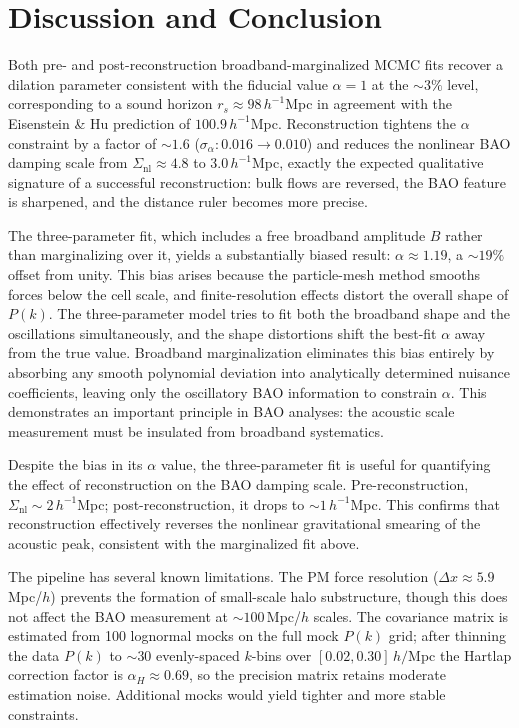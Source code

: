 \documentclass[10pt]{article}
\begin{document}
\section{Discussion and Conclusion}
\label{sec:discussion}

Both pre- and post-reconstruction broadband-marginalized MCMC fits recover a dilation parameter consistent with the fiducial value $\alpha = 1$ at the $\sim\!3\%$ level, corresponding to a sound horizon $r_s \approx 98\,h^{-1}$Mpc in agreement with the Eisenstein \& Hu prediction of $100.9\,h^{-1}$Mpc.  Reconstruction tightens the $\alpha$ constraint by a factor of $\sim\!1.6$ ($\sigma_\alpha: 0.016 \to 0.010$) and reduces the nonlinear BAO damping scale from $\Sigma_{\mathrm{nl}} \approx 4.8$ to $3.0\,h^{-1}$Mpc, exactly the expected qualitative signature of a successful reconstruction: bulk flows are reversed, the BAO feature is sharpened, and the distance ruler becomes more precise.

The three-parameter fit, which includes a free broadband amplitude $B$ rather than marginalizing over it, yields a substantially biased result: $\alpha \approx 1.19$, a $\sim\!19\%$ offset from unity.  This bias arises because the particle-mesh method smooths forces below the cell scale, and finite-resolution effects distort the overall shape of $P(k)$.  The three-parameter model tries to fit both the broadband shape and the oscillations simultaneously, and the shape distortions shift the best-fit $\alpha$ away from the true value.  Broadband marginalization eliminates this bias entirely by absorbing any smooth polynomial deviation into analytically determined nuisance coefficients, leaving only the oscillatory BAO information to constrain $\alpha$.  This demonstrates an important principle in BAO analyses: the acoustic scale measurement must be insulated from broadband systematics.

Despite the bias in its $\alpha$ value, the three-parameter fit is useful for quantifying the effect of reconstruction on the BAO damping scale.  Pre-reconstruction, $\Sigma_{\mathrm{nl}} \sim 2\,h^{-1}$Mpc; post-reconstruction, it drops to $\sim 1\,h^{-1}$Mpc.  This confirms that reconstruction effectively reverses the nonlinear gravitational smearing of the acoustic peak, consistent with the marginalized fit above.

The pipeline has several known limitations.  The PM force resolution ($\Delta x \approx 5.9$\,Mpc/$h$) prevents the formation of small-scale halo substructure, though this does not affect the BAO measurement at $\sim\!100$\,Mpc/$h$ scales.  The covariance matrix is estimated from 100 lognormal mocks on the full mock $P(k)$ grid; after thinning the data $P(k)$ to $\sim\!30$ evenly-spaced $k$-bins over $[0.02, 0.30]\,h/$Mpc the Hartlap correction factor is $\alpha_H \approx 0.69$, so the precision matrix retains moderate estimation noise.  Additional mocks would yield tighter and more stable constraints.
\end{document}
